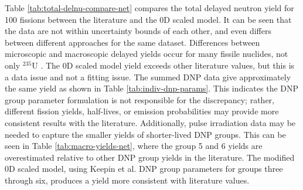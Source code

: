 Table \ref{tab:total-delnu-compare-net} compares the total delayed neutron yield for 100 fissions between the literature and the 0D scaled model.
It can be seen that the data are not within uncertainty bounds of each other, and even differs between different approaches for the same dataset.
Differences between microscopic and macroscopic delayed yields occur for many fissile nuclides, not only $^{235}$U \cite{mathieu2012new}.
The 0D scaled model yield exceeds other literature values, but this is a data issue and not a fitting issue. 
The summed \gls{DNP} data give approximately the same yield as shown in Table \ref{tab:indiv-dnp-params}.
This indicates the \gls{DNP} group parameter formulation is not responsible for the discrepancy; rather, different fission yields, half-lives, or emission probabilities may provide more consistent results with the literature. 
Additionally, pulse irradiation data may be needed to capture the smaller yields of shorter-lived \gls{DNP} groups.
This can be seen in Table \ref{tab:macro-yields-net}, where the group 5 and 6 yields are overestimated relative to other \gls{DNP} group yields in the literature.
The modified 0D scaled model, using Keepin et al. \gls{DNP} group parameters for groups three through six, produces a yield more consistent with literature values.


